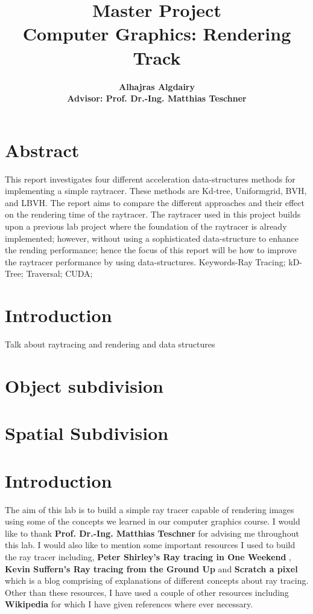 \documentclass[11pt,a4paper]{article}
\begin{document}
	
	\title{\textbf{Master Project \\ Computer Graphics: Rendering Track}}
	\author{\textbf{Alhajras Algdairy} \\ \textbf{Advisor: Prof. 
			Dr.-Ing. Matthias Teschner}}
	\maketitle
	
	\section{Abstract}
	This report investigates four different acceleration data-structures methods for implementing a simple raytracer. These methods are Kd-tree, Uniformgrid, BVH, and LBVH. The report aims to compare the different approaches and their effect on the rendering time of the raytracer. The raytracer used in this project builds upon a previous lab project where the foundation of the raytracer is already implemented; however, without using a sophisticated data-structure to enhance the rending performance; hence the focus of this report will be how to improve the raytracer performance by using data-structures. 
	Keywords-Ray Tracing; kD-Tree; Traversal; CUDA;
	
	\section{Introduction}
	Talk about raytracing and rendering and data structures
	
	\section{Object subdivision}
	\section{Spatial Subdivision}
	\section{Introduction}
	The aim of this lab is to build a simple ray tracer capable of rendering images using some of the concepts we learned in our computer graphics course. I would like to thank \textbf{Prof. Dr.-Ing. Matthias Teschner} for advising me throughout this lab. I would also like to mention some important resources I used to build the ray tracer including, \textbf{Peter Shirley's Ray tracing in One Weekend} \cite{Shirley2020RTW1}, \textbf{Kevin Suffern's Ray tracing from the Ground Up} \cite{suffern2016ray} and \textbf{Scratch a pixel} \cite{scratchapixel} which is a blog comprising of explanations of different concepts about ray tracing. Other than these resources, I have used a couple of other resources including \textbf{Wikipedia} for which I have given references where ever necessary.
	
\end{document}
